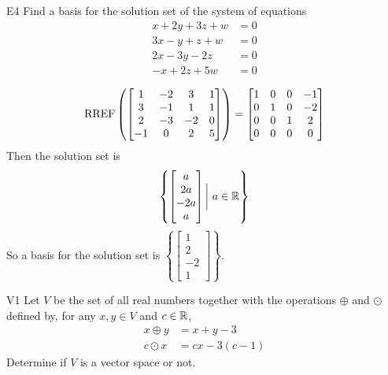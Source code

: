 \documentclass{sbgLAquiz}
\begin{document}
\begin{extract}\newpage\end{extract}
\begin{problem}{E4} 
Find a basis for the solution set of the system of equations
\begin{align*}
x+2y+3z+w &= 0 \\
3x-y+z+w &= 0 \\
2x-3y-2z &= 0 \\
-x+2z+5w &=0
\end{align*}
\end{problem}
\begin{solution}
$$\operatorname{RREF} \left(\begin{bmatrix} 1 & -2 & 3 & 1 \\ 3 & -1 & 1 & 1 \\ 2 & -3 & -2 & 0 \\ -1 & 0 & 2 & 5 \end{bmatrix} \right) = \begin{bmatrix} 1 & 0 & 0 & -1 \\ 0 & 1 & 0 & -2 \\ 0 & 0 & 1 & 2 \\ 0 & 0 & 0 & 0\end{bmatrix}$$
Then the solution set is
$$\left\{ \begin{bmatrix} a \\ 2a \\ -2a \\ a \end{bmatrix} \bigg |\ a \in \mathbb{R} \right\}$$
So a basis for the solution set is $\left\{\begin{bmatrix} 1 \\ 2 \\ -2 \\ 1\end{bmatrix} \right\}$.
\end{solution}


\begin{problem}{V1}
Let $V$ be the  set of all real numbers together with the operations $\oplus$ and $\odot$ defined by, for any $x,y \in V$ and $c \in \mathbb{R}$,
\begin{align*}
x\oplus y  &= x+y-3 \\
c \odot x &= cx-3(c-1)
\end{align*}
Determine if $V$ is a vector space or not.
\end{problem}
\end{document}
